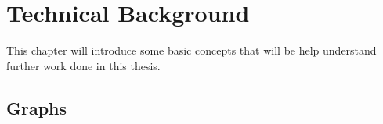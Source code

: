 \chapter{Technical Background}\label{chap:background}
\beginchapter
This chapter will introduce some basic concepts that will be help understand further work done in this thesis.

\section{Graphs}